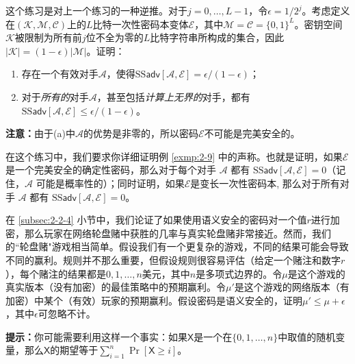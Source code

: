 \begin{exercise}[匹配的边界]
这个练习是对上一个练习的一种逆推。对于$j=0,\dots,L-1$，令$\epsilon=1/2^j$。考虑定义在$(\mathcal{K},\mathcal{M},\mathcal{C})$上的$L$比特一次性密码本变体$\mathcal{E}$，其中$\mathcal{M}=\mathcal{C}=\{0,1\}^L$。密钥空间$\mathcal{K}$被限制为所有前$j$位不全为零的$L$比特字符串所构成的集合，因此 $|\mathcal{K}|=(1-\epsilon)|\mathcal{M}|$。证明：
\begin{enumerate}[\indent(a)]
	\item 存在一个有效对手$\mathcal{A}$，使得$\mathrm{SS}\mathsf{adv}[\mathcal{A},\mathcal{E}]=\epsilon/(1-\epsilon)$；
	\item 对于\emph{所有的}对手$\mathcal{A}$，甚至包括\emph{计算上无界的}对手，都有$\mathrm{SS}\mathsf{adv}[\mathcal{A},\mathcal{E}]\leq\epsilon/(1-\epsilon)$。
\end{enumerate}
\textbf{注意：}由于(a)中$\mathcal{A}$的优势是非零的，所以密码$\mathcal{E}$不可能是完美安全的。
\end{exercise}

\begin{exercise}[确定性密码]
在这个练习中，我们要求你详细证明例 \ref{exmp:2-9} 中的声称。也就是证明，如果$\mathcal{E}$是一个完美安全的确定性密码，那么对于每个对手 $\mathcal{A}$ 都有 $\mathrm{SS}\mathsf{adv}[\mathcal{A},\mathcal{E}]=0$（记住，$\mathcal{A}$ 可能是概率性的）；同时证明，如果$\mathcal{E}$是变长一次性密码本, 那么对于所有对手 $\mathcal{A}$ 都有 $\mathrm{SS}\mathsf{adv}[\mathcal{A},\mathcal{E}]=0$。
\end{exercise}

\begin{exercise}[轮盘赌]
在 \ref{subsec:2-2-4} 小节中，我们论证了如果使用语义安全的密码对一个值$r$进行加密，那么玩家在网络轮盘赌中获胜的几率与真实轮盘赌非常接近。然而，我们的``轮盘赌"游戏相当简单。假设我们有一个更复杂的游戏，不同的结果可能会导致不同的赢利。规则并不那么重要，但假设规则很容易评估（给定一个赌注和数字$r$），每个赌注的结果都是$0,1,\dots,n$美元，其中$n$是多项式边界的。令$\mu$是这个游戏的真实版本（没有加密）的最佳策略中的预期赢利。令$\mu'$是这个游戏的网络版本（有加密）中某个（有效）玩家的预期赢利。假设密码是语义安全的，证明$\mu'\leq\mu+\epsilon$，其中$\epsilon$可忽略不计。

	\vspace{3pt}
	
\noindent
\textbf{提示：}你可能需要利用这样一个事实：如果$\mathsf{X}$是一个在$\{0,1,\dots,n\}$中取值的随机变量，那么$\mathsf{X}$的期望等于$\sum_{i=1}^n\Pr[\mathsf{X}\geq i]$。
\end{exercise}

